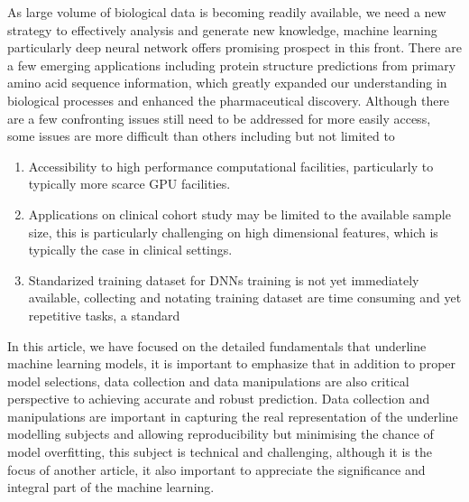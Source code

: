 As large volume of biological data is becoming readily available, we need a new strategy to effectively analysis and generate new knowledge, machine learning particularly deep neural network offers promising prospect in this front. There are a few emerging applications including protein structure predictions from primary amino acid sequence information, which greatly expanded our understanding in biological processes and enhanced the pharmaceutical discovery. Although there are a few confronting issues still need to be addressed for more easily access, some issues are more difficult than others including but not limited to 
\begin{enumerate}
    \item Accessibility to high performance computational facilities, particularly to typically more scarce GPU facilities. 
    \item Applications on clinical cohort study may be limited to the available sample size, this is particularly challenging on high dimensional features, which is typically the case in clinical settings. 
    \item Standarized training dataset for DNNs training is not yet immediately available, collecting and notating training dataset are time consuming and yet repetitive tasks, a standard 
\end{enumerate}
\par
In this article, we have focused on the detailed fundamentals that underline machine learning models, it is important to emphasize that in addition to proper model selections, data collection and data manipulations are also critical perspective to achieving accurate and robust prediction. Data collection and manipulations are important in capturing the real representation of the underline modelling subjects and allowing reproducibility but minimising the chance of model overfitting, this subject is technical and challenging, although it is the focus of another article, it also important to appreciate the significance and integral part of the machine learning. 
\par 
